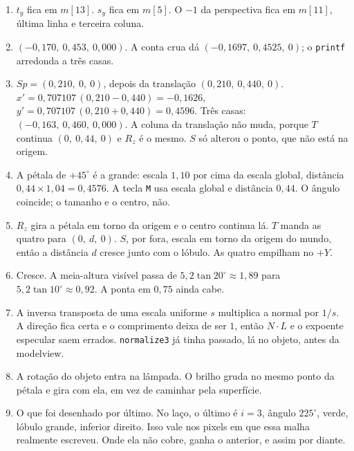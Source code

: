 \documentclass[11pt,a4paper]{article}
\newcommand{\fn}[1]{\texttt{\nobreak\hspace{0pt}#1}}
\begin{document}
\begin{enumerate}
\item \(t_y\) fica em \(m[13]\). \(s_y\) fica em \(m[5]\). O \(-1\) da perspectiva fica em \(m[11]\), última linha e terceira coluna.

\item \((-0{,}170,\ 0{,}453,\ 0{,}000)\). A conta crua dá \((-0{,}1697,\ 0{,}4525,\ 0)\); o \fn{printf} arredonda a três casas.

\item \(S p = (0{,}210,\ 0,\ 0)\), depois da translação \((0{,}210,\ 0{,}440,\ 0)\).
\(x' = 0{,}707107\,(0{,}210 - 0{,}440) = -0{,}1626\),
\(y' = 0{,}707107\,(0{,}210 + 0{,}440) = 0{,}4596\).
Três casas: \((-0{,}163,\ 0{,}460,\ 0{,}000)\). A coluna da translação não muda, porque \(T\) continua \((0,\ 0{,}44,\ 0)\) e \(R_z\) é o mesmo. \(S\) só alterou o ponto, que não está na origem.

\item A pétala de \(+45^\circ\) é a grande: escala \(1{,}10\) por cima da escala global, distância \(0{,}44 \times 1{,}04 = 0{,}4576\). A tecla \fn{M} usa escala global e distância \(0{,}44\). O ângulo coincide; o tamanho e o centro, não.

\item \(R_z\) gira a pétala em torno da origem e o centro continua lá. \(T\) manda as quatro para \((0,\ d,\ 0)\). \(S\), por fora, escala em torno da origem do mundo, então a distância \(d\) cresce junto com o lóbulo. As quatro empilham no \(+Y\).

\item Cresce. A meia-altura visível passa de \(5{,}2\tan 20^\circ \approx 1{,}89\) para \(5{,}2\tan 10^\circ \approx 0{,}92\). A ponta em \(0{,}75\) ainda cabe.

\item A inversa transposta de uma escala uniforme \(s\) multiplica a normal por \(1/s\). A direção fica certa e o comprimento deixa de ser \(1\), então \(N\cdot L\) e o expoente especular saem errados. \fn{normalize3} já tinha passado, lá no objeto, antes da modelview.

\item A rotação do objeto entra na lâmpada. O brilho gruda no mesmo ponto da pétala e gira com ela, em vez de caminhar pela superfície.

\item O que foi desenhado por último. No laço, o último é \(i = 3\), ângulo \(225^\circ\), verde, lóbulo grande, inferior direito. Isso vale nos pixels em que essa malha realmente escreveu. Onde ela não cobre, ganha o anterior, e assim por diante.


\end{enumerate}
\end{document}
